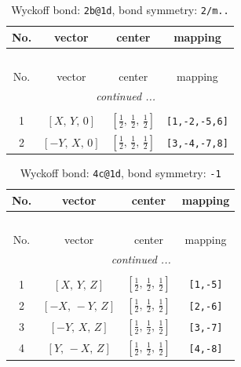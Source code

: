 \documentclass[fleqn,8pt]{jsarticle}
\begin{document}
\renewcommand{\arraystretch}{1.2}
\begin{longtable}{cccc}
\caption{Wyckoff bond: {\tt 2b@1d}, bond symmetry: {\tt 2/m..}}
 \\
 \hline \hline
No. & vector & center & mapping \\ \hline \endfirsthead

\multicolumn{3}{l}{\tablename\ \thetable{}} \\
 \hline \hline
No. & vector & center & mapping \\ \hline \endhead

 \hline \hline
\multicolumn{3}{r}{\footnotesize\it continued ...} \\ \endfoot

 \hline \hline
\multicolumn{3}{r}{} \\ \endlastfoot

1 & $\left[ X,\, Y,\, 0 \right]$ & $\left[ \frac{1}{2},\, \frac{1}{2},\, \frac{1}{2} \right]$ & {\tt [1,-2,-5,6]} \\ \hline
2 & $\left[ - Y,\, X,\, 0 \right]$ & $\left[ \frac{1}{2},\, \frac{1}{2},\, \frac{1}{2} \right]$ & {\tt [3,-4,-7,8]} \\
\end{longtable}
\renewcommand{\arraystretch}{1.2}
\begin{longtable}{cccc}
\caption{Wyckoff bond: {\tt 4c@1d}, bond symmetry: {\tt -1}}
 \\
 \hline \hline
No. & vector & center & mapping \\ \hline \endfirsthead

\multicolumn{3}{l}{\tablename\ \thetable{}} \\
 \hline \hline
No. & vector & center & mapping \\ \hline \endhead

 \hline \hline
\multicolumn{3}{r}{\footnotesize\it continued ...} \\ \endfoot

 \hline \hline
\multicolumn{3}{r}{} \\ \endlastfoot

1 & $\left[ X,\, Y,\, Z \right]$ & $\left[ \frac{1}{2},\, \frac{1}{2},\, \frac{1}{2} \right]$ & {\tt [1,-5]} \\ \hline
2 & $\left[ - X,\, - Y,\, Z \right]$ & $\left[ \frac{1}{2},\, \frac{1}{2},\, \frac{1}{2} \right]$ & {\tt [2,-6]} \\ \hline
3 & $\left[ - Y,\, X,\, Z \right]$ & $\left[ \frac{1}{2},\, \frac{1}{2},\, \frac{1}{2} \right]$ & {\tt [3,-7]} \\ \hline
4 & $\left[ Y,\, - X,\, Z \right]$ & $\left[ \frac{1}{2},\, \frac{1}{2},\, \frac{1}{2} \right]$ & {\tt [4,-8]} \\
\end{longtable}
\end{document}
